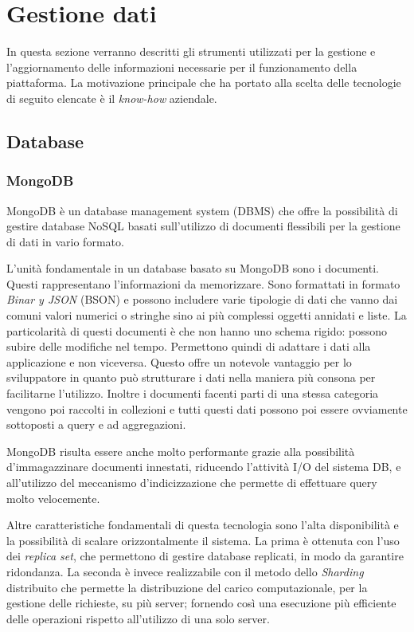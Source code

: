 \section{Gestione dati}
In questa sezione verranno descritti gli strumenti utilizzati per la gestione e l'aggiornamento delle informazioni
necessarie per il funzionamento della piattaforma.
La motivazione principale che ha portato alla scelta delle tecnologie di seguito elencate è il \textit{know-how} aziendale.

\subsection{Database}
\subsubsection{MongoDB}
MongoDB \cite{MongoDB} è un database management system (DBMS) che offre la possibilità di gestire database NoSQL
basati sull'utilizzo di documenti flessibili per la gestione di dati in vario formato\cite{IBM-MongoDB}.

L'unità fondamentale in un database basato su MongoDB sono i documenti. Questi rappresentano l'informazioni da memorizzare.
Sono formattati in formato \textit{Binar y JSON} (BSON) e possono includere varie tipologie di dati che vanno dai comuni
valori numerici o stringhe sino ai più complessi oggetti annidati e liste.
La particolarità di questi documenti è che non hanno uno schema rigido: possono subire delle modifiche nel tempo.
Permettono quindi di adattare i dati alla applicazione e non viceversa.
Questo offre un notevole vantaggio per lo sviluppatore in quanto può strutturare i dati nella maniera più consona per facilitarne l'utilizzo.
Inoltre i documenti facenti parti di una stessa categoria vengono poi raccolti in collezioni e tutti questi dati possono poi essere ovviamente sottoposti a query e ad aggregazioni.

MongoDB risulta essere anche molto performante grazie alla possibilità d'immagazzinare documenti innestati, riducendo l'attività I/O del sistema DB,
e all'utilizzo del meccanismo d'indicizzazione che permette di effettuare query molto velocemente.

Altre caratteristiche fondamentali di questa tecnologia sono l'alta disponibilità e la possibilità di scalare orizzontalmente il sistema.
La prima è ottenuta con l'uso dei \textit{replica set}, che permettono di gestire database replicati, in modo da garantire ridondanza.
La seconda è invece realizzabile con il metodo dello \textit{Sharding} distribuito che permette
la distribuzione del carico computazionale, per la gestione delle richieste, su più server; fornendo così una esecuzione più efficiente delle operazioni rispetto all'utilizzo di una solo server.


